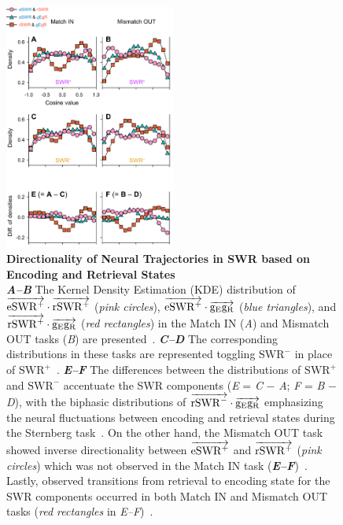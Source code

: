 \documentclass[final,3p,times,twocolumn]{elsarticle}
\begin{document}
        \clearpage
        \begin{figure}[ht]
        	\centering
            \includegraphics[width=0.5\textwidth]{./src/figures/.png/Figure_ID_07.png}
        	\caption{\textbf{
Directionality of Neural Trajectories in SWR based on Encoding and Retrieval States
}
\smallskip
\\
\textbf{\textit{A--B}} The Kernel Density Estimation (KDE) distribution of $\protect\overrightarrow{{\mathrm{eSWR^+}}} \cdot \protect\overrightarrow{{\mathrm{rSWR^+}}}$ (\textit{pink circles}), $\protect\overrightarrow{{\mathrm{eSWR^+}}} \cdot \protect\overrightarrow{{\mathrm{g_{E}g_{R}}}}$ (\textit{blue triangles}), and $\protect\overrightarrow{{\mathrm{rSWR^+}}} \cdot \protect\overrightarrow{{\mathrm{g_{E}g_{R}}}}$ (\textit{red rectangles}) in the Match IN (\textit{A}) and Mismatch OUT tasks (\textit{B}) are presented~\cite{li_functional_2023}. \textbf{\textit{C--D}} The corresponding distributions in these tasks are represented toggling $\mathrm{SWR^-}$ in place of $\mathrm{SWR^+}$~\cite{dimakopoulos_information_2022}. \textbf{\textit{E--F}} The differences between the distributions of $\mathrm{SWR^+}$ and $\mathrm{SWR^-}$ accentuate the SWR components (\textit{E} = \textit{C} $-$ \textit{A}; \textit{F} = \textit{B} $-$ \textit{D}), with the biphasic distributions of $\protect\overrightarrow{{\mathrm{rSWR^-}}} \cdot \protect\overrightarrow{{\mathrm{g_{E}g_{R}}}}$ emphasizing the neural fluctuations between encoding and retrieval states during the Sternberg task~\cite{borders_hippocampus_2022}. On the other hand, the Mismatch OUT task showed inverse directionality between $\protect\overrightarrow{{\mathrm{eSWR^+}}}$ and $\protect\overrightarrow{{\mathrm{rSWR^+}}}$ (\textit{pink circles}) which was not observed in the Match IN task (\textbf{\textit{E--F}})~\cite{naber_reciprocal_2001,van_strien_anatomy_2009}. Lastly, observed transitions from retrieval to encoding state for the SWR components occurred in both Match IN and Mismatch OUT tasks (\textit{red rectangles} in \textit{E--F})~\cite{niediek_reliable_2016,schomburg_spiking_2012}.
}
        	\label{fig:07}
        \end{figure}


\end{document}
